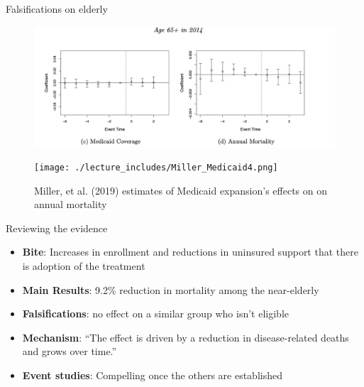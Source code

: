\documentclass{beamer}
\begin{document}




\begin{frame}{Falsifications on elderly}

	\begin{figure}
\includegraphics[scale=0.425]{./lecture_includes/placebo_medicaid}
	\end{figure}

\end{frame}



\begin{frame}[plain]

	\begin{figure}
	\texttt{[image: ./lecture\_includes/Miller\_Medicaid4.png]}
	\caption{Miller, et al. (2019) estimates of Medicaid expansion's effects on on annual mortality}
	\end{figure}

\end{frame}

\begin{frame}{Reviewing the evidence}

\begin{itemize}
\item \textbf{Bite}: Increases in enrollment and reductions in uninsured support that there is adoption of the treatment
\item \textbf{Main Results}: 9.2\% reduction in mortality among the near-elderly
\item \textbf{Falsifications}: no effect on a similar group who isn't eligible
\item \textbf{Mechanism}: ``The effect is driven by a reduction in disease-related deaths and grows over time.''
\item \textbf{Event studies}: Compelling once the others are established
\end{itemize}

\end{frame}
\end{document}
